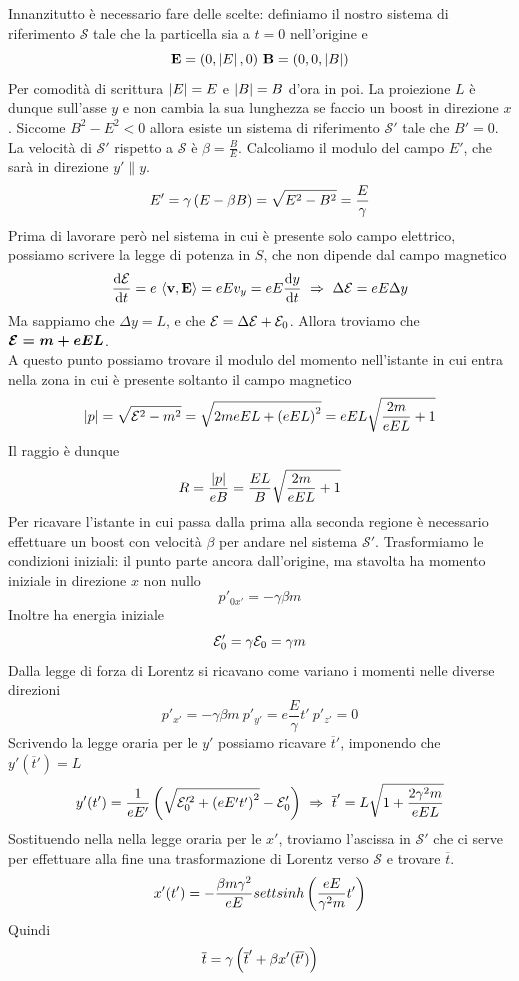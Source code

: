 \documentclass[12pt,twoside,a4]{article}
\begin{document}
\newpage
\begin{solution}
Innanzitutto è necessario fare delle scelte: definiamo il nostro sistema di riferimento $\mathcal{S}$ tale che la particella sia a $t=0$ nell'origine e 
$$ \textbf{E} = (0, \left| {E} \right|, 0)  \  \textbf{B} = (0, 0, \left| {B} \right|)$$
Per comodità  di scrittura $\left| {E} \right| = E$ e $\left| {B} \right| = B$ d'ora in poi. La proiezione $L$ è dunque sull'asse $y$ e non cambia la sua lunghezza se faccio un boost in direzione $x$. Siccome $B^2 - E^2 < 0$ allora esiste un sistema di riferimento $\mathcal{S}'$ tale che $B' = 0$. La velocità  di $\mathcal{S}'$ rispetto a $\mathcal{S}$ è $\beta = \frac{B}{E}$. Calcoliamo il modulo del campo $E'$, che sarà  in direzione $y' \parallel y$.
$$ E' = \gamma \left({E - \beta B}\right) = \sqrt{E^2 - B^2} = \frac{E}{\gamma} $$
Prima di lavorare però nel sistema in cui è presente solo campo elettrico, possiamo scrivere la legge di potenza in $S$, che non dipende dal campo magnetico
$$ \dfrac{\mbox{d}{\mathcal{E}}}{\mbox{d}{t}} = e \mbox{ } \langle{\textbf{v}},{\textbf{E}}\rangle = e E v_y = e E \dfrac{\mbox{d}{y}}{\mbox{d}{t}} 
 \  \Rightarrow  \  \Delta \mathcal{E} = e E \Delta y$$
Ma sappiamo che $\Delta y = L$, e che $\mathcal{E} = \Delta \mathcal{E} + \mathcal{E}_0$. Allora troviamo che $\boldsymbol{\mathcal{E} = m + eEL}$.
\\
A questo punto possiamo trovare il modulo del momento nell'istante in cui entra nella zona in cui è presente soltanto il campo magnetico
$$ \left| {p} \right| = \sqrt{\mathcal{E}^2 -m^2} = \sqrt{2 m eEL + \left({eEL}\right)^2} = 
eEL \sqrt{\frac{2 m}{eEL} +1}$$
Il raggio è dunque
$$ R = \frac{\left| {p} \right|}{e B} = \frac{EL}{B}\sqrt{\frac{2 m}{eEL} +1} $$
Per ricavare l'istante in cui passa dalla prima alla seconda regione è necessario effettuare un boost con velocità  $\beta$ per andare nel sistema $\mathcal{S}'$. Trasformiamo le condizioni iniziali: il punto parte ancora dall'origine, ma stavolta ha momento iniziale in direzione $x$ non nullo
$$ p'_{0x'} = - \gamma \beta m$$
Inoltre ha energia iniziale
$$ \mathcal{E}'_0 = \gamma \mathcal{E}_0 = \gamma m $$
Dalla legge di forza di Lorentz si ricavano come variano i momenti nelle diverse direzioni
$$ p'_{x'} = - \gamma \beta m  \  p'_{y'} = e \frac{E}{\gamma} t'  \  p'_{z'} = 0$$
Scrivendo la legge oraria per le $y'$ possiamo ricavare $\overline{t}'$, imponendo che $y'(\overline{t}') = L$
$$ y'(t') = \frac{1}{e E'} \left({\sqrt{\mathcal{E}'^2_0 + \left({e E' t'}\right)^2} - \mathcal{E}'_0}\right)  \  \Rightarrow  \  \overline{t}' = L \sqrt{ 1 +\frac{2 \gamma^2 m}{e E L}}$$
Sostituendo nella nella legge oraria per le $x'$, troviamo l'ascissa in $\mathcal{S}'$ che ci serve per effettuare alla fine una trasformazione di Lorentz verso $\mathcal{S}$ e trovare $\overline{t}$. 
$$ x'(t') = - \frac{\beta m \gamma^2}{e E} settsinh\left({ \frac{e E}{\gamma^2 m} t'}\right)$$
Quindi
$$ \overline{t} = \gamma \left({ \overline{t}' + \beta x'(\overline{t'})}\right)$$
\end{solution}
\end{document}

